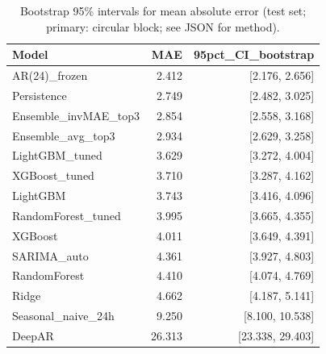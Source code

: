 \begin{table}[t]
\centering
\small
\caption{Bootstrap 95\% intervals for mean absolute error (test set; primary: circular block; see JSON for method).}
\label{tab:bootstrap_mae}
\begin{tabular}{lrr}
\toprule
Model & MAE & 95pct\_CI\_bootstrap \\
\midrule
AR(24)\_frozen & 2.412 & [2.176, 2.656] \\
Persistence & 2.749 & [2.482, 3.025] \\
Ensemble\_invMAE\_top3 & 2.854 & [2.558, 3.168] \\
Ensemble\_avg\_top3 & 2.934 & [2.629, 3.258] \\
LightGBM\_tuned & 3.629 & [3.272, 4.004] \\
XGBoost\_tuned & 3.710 & [3.287, 4.162] \\
LightGBM & 3.743 & [3.416, 4.096] \\
RandomForest\_tuned & 3.995 & [3.665, 4.355] \\
XGBoost & 4.011 & [3.649, 4.391] \\
SARIMA\_auto & 4.361 & [3.927, 4.803] \\
RandomForest & 4.410 & [4.074, 4.769] \\
Ridge & 4.662 & [4.187, 5.141] \\
Seasonal\_naive\_24h & 9.250 & [8.100, 10.538] \\
DeepAR & 26.313 & [23.338, 29.403] \\
\bottomrule
\end{tabular}
\end{table}
